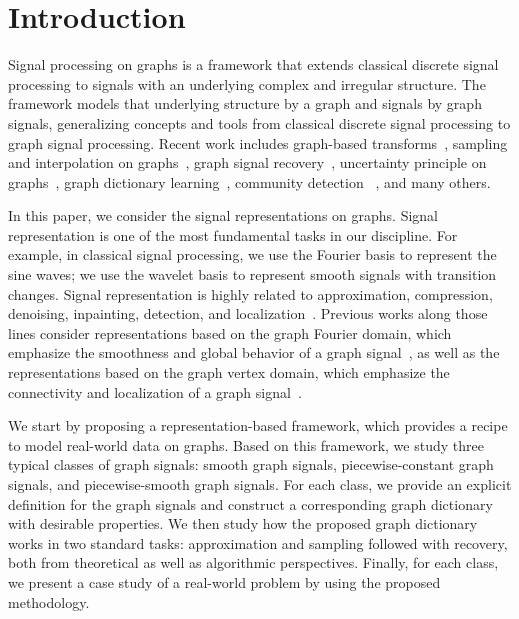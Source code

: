 \documentclass[journal,twocolumn,10pt]{IEEEtran}
\theoremstyle{definition}
\begin{document}
\section{Introduction}
\label{sec:intro}
Signal processing on graphs is a framework that extends classical discrete signal processing to
signals with an underlying complex and irregular
structure. The framework models that underlying structure by a graph and signals by graph signals, generalizing concepts and tools from classical discrete signal
processing to graph signal processing.  Recent work includes graph-based transforms~\cite{SandryhailaM:13,HammondVG:11,NarangSO:10}, sampling and interpolation
on graphs~\cite{Pesenson:08, AnisGO:14, ChenVSK:15a}, graph signal recovery~\cite{ChenSMK:14, WangLG:14, WangLG:15a, ChenVSK:15}, uncertainty principle on graphs~\cite{AgaskarL:13, TsitsveroBL:15},  graph
dictionary learning~\cite{DongTFV:14, ThanouSF:14},  community detection~\cite{Tremblay:14, ChenH:15, ChenH:15a} , and many others.

In this paper, we consider the signal representations on graphs. Signal representation is one of the most fundamental tasks in our discipline. For example, in classical signal processing, we use the Fourier basis to represent the sine waves; we use the wavelet  basis to represent smooth signals with transition changes. Signal representation is highly related to approximation, compression, denoising, inpainting, detection, and localization~\cite{Mallat:09, VetterliKG:12}.  Previous works along those lines consider representations based on the graph Fourier domain, which emphasize the smoothness and global behavior of a graph signal~\cite{ShumanRV:15}, as well as  the representations based on the graph vertex domain, which emphasize the connectivity and localization of a graph signal~\cite{GavishNC:10, CrovellaK:13}.

We start by proposing  a representation-based  framework, which provides a recipe to model real-world data on graphs. Based on this framework, we study three typical classes of graph signals: smooth graph signals, piecewise-constant graph signals, and piecewise-smooth graph signals. For each class, we provide an explicit definition for the graph signals and construct a corresponding graph dictionary with desirable properties. We then study how the proposed graph dictionary works in two standard tasks: approximation and sampling followed with recovery, both from theoretical as well as algorithmic perspectives. Finally, for each class, we present a case study of a real-world problem by using the proposed methodology.
\end{document}
